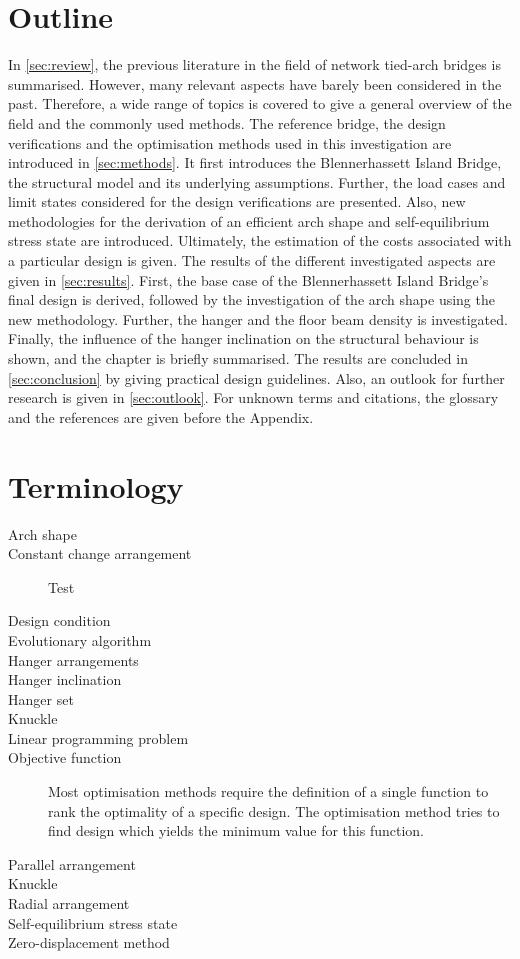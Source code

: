 \section{Outline} \label{sec:int_out}
In \cref{sec:review}, the previous literature in the field of network tied-arch bridges is summarised. However, many relevant aspects have barely been considered in the past. Therefore, a wide range of topics is covered to give a general overview of the field and the commonly used methods. The reference bridge, the design verifications and the optimisation methods used in this investigation are introduced in \cref{sec:methods}. It first introduces the Blennerhassett Island Bridge, the structural model and its underlying assumptions. Further, the load cases and limit states considered for the design verifications are presented. Also, new methodologies for the derivation of an efficient arch shape and self-equilibrium stress state are introduced. Ultimately, the estimation of the costs associated with a particular design is given. The results of the different investigated aspects are given in \cref{sec:results}. First, the base case of the Blennerhassett Island Bridge's final design is derived, followed by the investigation of the arch shape using the new methodology. Further, the hanger and the floor beam density is investigated. Finally, the influence of the hanger inclination on the structural behaviour is shown, and the chapter is briefly summarised. The results are concluded in \cref{sec:conclusion} by giving practical design guidelines. Also, an outlook for further research is given in \cref{sec:outlook}. For unknown terms and citations, the glossary and the references are given before the Appendix.

\section{Terminology}
\begin{description}
    \item[Arch shape]
    \item[Constant change arrangement] Test
    \item[Design condition]
    \item[Evolutionary algorithm]
    \item[Hanger arrangements]
    \item[Hanger inclination]
    \item[Hanger set]
    \item[Knuckle]
    \item[Linear programming problem]
    \item[Objective function] Most optimisation methods require the definition of a single function to rank the optimality of a specific design. The optimisation method tries to find design which yields the minimum value for this function.
    \item[Parallel arrangement]
    \item[Knuckle]
    \item[Radial arrangement]
    \item[Self-equilibrium stress state]
    \item[Zero-displacement method]
\end{description}
